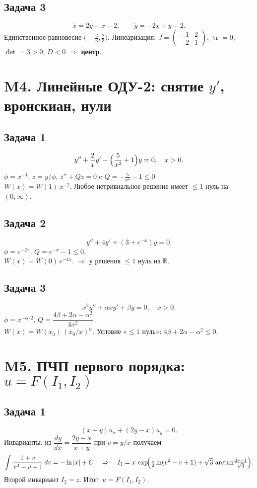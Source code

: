 \documentclass[12pt]{article}
\begin{document}
\subsection*{Задача 3}
\[
\dot x=2y-x-2,\qquad \dot y=-2x+y-2.
\]
Единственное равновесие $\bigl(-\tfrac23,\tfrac23\bigr)$.
Линеаризация: $J=\begin{pmatrix}-1&2\\-2&1\end{pmatrix}$,
$\operatorname{tr}=0$, $\det=3>0$, $D<0$ $\Rightarrow$ \textbf{центр}.

\section*{M4. Линейные ОДУ-2: снятие $y'$, вронскиан, нули}

\subsection*{Задача 1}
\[
y''+\frac{2}{x}y'-\Bigl(\frac{5}{x^2}+1\Bigr)y=0,\quad x>0.
\]
$\phi=x^{-1}$, \(z=y/\phi\), \(z''+Qz=0\) c \(Q=-\tfrac{5}{x^2}-1\le0\). \\
\(W(x)=W(1)\,x^{-2}\). Любое нетривиальное решение имеет $\le1$ нуль на $(0,\infty)$.

\subsection*{Задача 2}
\[
y''+4y'+(3+e^{-x})y=0.
\]
$\phi=e^{-2x}$, \(Q=e^{-x}-1\le0\). \\
\(W(x)=W(0)\,e^{-4x}\). $\Rightarrow$ у решения $\le1$ нуль на $\mathbb R$.

\subsection*{Задача 3}
\[
x^2y''+\alpha x y'+\beta y=0,\quad x>0.
\]
$\phi=x^{-\alpha/2}$, \(Q=\dfrac{4\beta+2\alpha-\alpha^2}{4x^2}\). \\
\(W(x)=W(x_0)\,(x_0/x)^{\alpha}\). Условие «$\le1$ нуль»: \(4\beta+2\alpha-\alpha^2\le0\).

\section*{M5. ПЧП первого порядка: $u=F(I_1,I_2)$}

\subsection*{Задача 1}
\[
(x+y)u_x+(2y-x)u_y=0.
\]
Инварианты: из $\dfrac{dy}{dx}=\dfrac{2y-x}{x+y}$ при $v=y/x$ получаем
\[
\int \frac{1+v}{v^2-v+1}\,dv=-\ln|x|+C\quad\Rightarrow\quad
I_1= x\,\exp\!\Bigl(\tfrac12\ln(v^2-v+1)+\sqrt3\,\arctan\!\tfrac{2v-1}{\sqrt3}\Bigr).
\]
Второй инвариант $I_2=z$. \quad Итог: \(u=F(I_1,I_2)\).
\end{document}
